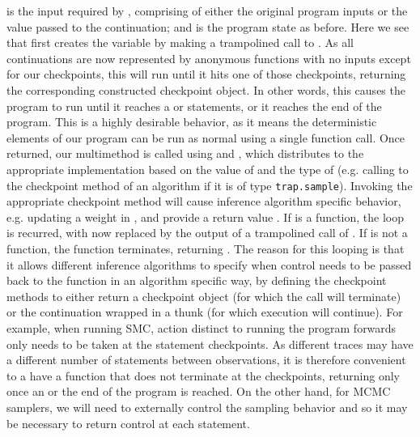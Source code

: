  is the input required by , comprising of either the original program inputs or the value
passed to the continuation; and \angstate is the program state as before.  Here we see that 
first creates the variable  by making a trampolined call to .  As all continuations are now
represented by anonymous functions with no inputs except for our checkpoints, this will run until it
hits one of those checkpoints, returning the corresponding constructed checkpoint object.  In other words,
this causes the program to run until it reaches a \sample or \observe statements, or it reaches the end of the
program.  This is a highly desirable behavior, as it means the deterministic elements of our program can be
run as normal using a single function call.
Once returned, our multimethod \checkpoint is called using  and
, which distributes to the appropriate \checkpoint implementation based on the value of
 and the type of  (e.g. calling to the \sample checkpoint method of an algorithm 
if it is of type  {\small \texttt{trap.sample}}).  
Invoking the appropriate checkpoint method will cause
inference algorithm specific behavior, e.g. updating a weight in \angstate, and provide a return value
.  If  is a function, the loop
is recurred, with  now replaced by the output of a trampolined call of .  If  is
not a function, the  function terminates, returning .  The reason for this looping is
that it allows different inference algorithms to specify when control needs to
be passed back to the \anginfer function in an algorithm specific way, by defining the checkpoint methods
to either return a checkpoint object (for which the  call will terminate) or the continuation
wrapped in a thunk (for which execution will continue).  For example, when running SMC,
action distinct to running the program forwards only needs to be taken at the \observe statement 
checkpoints.  As different traces may have a different number of \sample statements between observations,
it is therefore convenient to a have a function that does not terminate at the \sample checkpoints, returning
only once an \observe or the end of the program is reached.  On the other hand, for MCMC samplers, we
will need to externally control the sampling behavior and so it may be necessary to return control at each
\sample statement.

